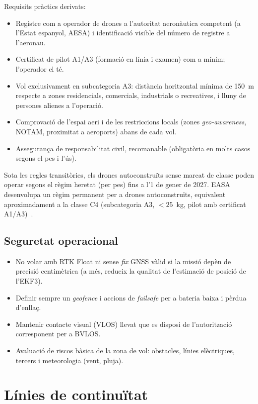 Requisits pràctics derivats:
\begin{itemize}
    \item Registre com a operador de drones a l'autoritat aeronàutica competent (a l'Estat espanyol, AESA) i identificació visible del número de registre a l'aeronau.
    \item Certificat de pilot A1/A3 (formació en línia i examen) com a mínim; l'operador el té.
    \item Vol exclusivament en subcategoria A3: distància horitzontal mínima de 150~m respecte a zones residencials, comercials, industrials o recreatives, i lluny de persones alienes a l'operació.
    \item Comprovació de l'espai aeri i de les restriccions locals (zones \emph{geo-awareness}, NOTAM, proximitat a aeroports) abans de cada vol.
    \item Assegurança de responsabilitat civil, recomanable (obligatòria en molts casos segons el pes i l'ús).
\end{itemize}

Sota les regles transitòries, els drones autoconstruïts sense marcat de classe poden operar segons el règim heretat (per pes) fins a l'1 de gener de 2027. EASA desenvolupa un règim permanent per a drones autoconstruïts, equivalent aproximadament a la classe C4 (subcategoria A3, $<25$~kg, pilot amb certificat A1/A3)~\cite{easa_open_category}.

\subsection{Seguretat operacional}

\begin{itemize}
    \item No volar amb RTK Float ni sense \emph{fix} GNSS vàlid si la missió depèn de precisió centimètrica (a més, redueix la qualitat de l'estimació de posició de l'EKF3).
    \item Definir sempre un \emph{geofence} i accions de \emph{failsafe} per a bateria baixa i pèrdua d'enllaç.
    \item Mantenir contacte visual (VLOS) llevat que es disposi de l'autorització corresponent per a BVLOS.
    \item Avaluació de riscos bàsica de la zona de vol: obstacles, línies elèctriques, tercers i meteorologia (vent, pluja).
\end{itemize}

\section{Línies de continuïtat}
\label{sec:treball-futur}

